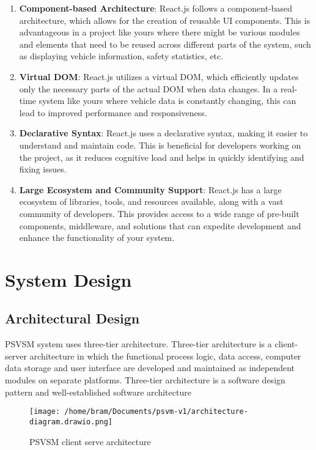 \documentclass[a4paper, 12pt]{report}
\begin{document}
\begin{enumerate}
    \item \textbf{Component-based Architecture}: React.js follows a component-based architecture, which allows for the creation of reusable UI components. This is advantageous in a project like yours where there might be various modules and elements that need to be reused across different parts of the system, such as displaying vehicle information, safety statistics, etc.
    
    \item \textbf{Virtual DOM}: React.js utilizes a virtual DOM, which efficiently updates only the necessary parts of the actual DOM when data changes. In a real-time system like yours where vehicle data is constantly changing, this can lead to improved performance and responsiveness.
    
    \item \textbf{Declarative Syntax}: React.js uses a declarative syntax, making it easier to understand and maintain code. This is beneficial for developers working on the project, as it reduces cognitive load and helps in quickly identifying and fixing issues.
    
    \item \textbf{Large Ecosystem and Community Support}: React.js has a large ecosystem of libraries, tools, and resources available, along with a vast community of developers. This provides access to a wide range of pre-built components, middleware, and solutions that can expedite development and enhance the functionality of your system.
\end{enumerate}


\chapter{System Design}
\section{Architectural Design} 
PSVSM system uses three-tier architecture. Three-tier architecture is a client-server architecture
in which the functional process logic, data access, computer data storage and user interface are
developed and maintained as independent modules on separate platforms. Three-tier architecture
is a software design pattern and well-established software architecture
\begin{figure}[h] %
  \centering
  \texttt{[image: /home/bram/Documents/psvm-v1/architecture-diagram.drawio.png]} %
  \caption{PSVSM client serve architecture} %
  \label{fig:psvsm structure} %
\end{figure}
\end{document}
